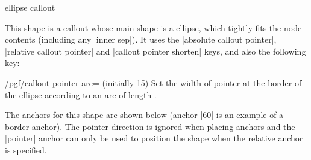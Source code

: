 \begin{shape}{ellipse callout}%
	
  This shape is a callout whose main shape is a ellipse, which 
  tightly fits the node contents (including any |inner sep|).
  It uses the |absolute callout pointer|, 
	|relative callout pointer| and |callout pointer shorten| keys, and
	also the following key:
  
  
\begin{key}{/pgf/callout pointer arc= (initially 15)} 
  Set the width of pointer at the border of the ellipse according
  to an arc of length .
\end{key}
	
	
	The anchors for this shape are shown below (anchor |60| is an
	example of a border anchor). The pointer direction is ignored 
	when placing anchors and the |pointer| anchor can only be
	used to position the shape when the relative anchor is 
	specified.
	
\begin{codeexample}[]
\Huge
{}
\end{codeexample}

\end{shape}


